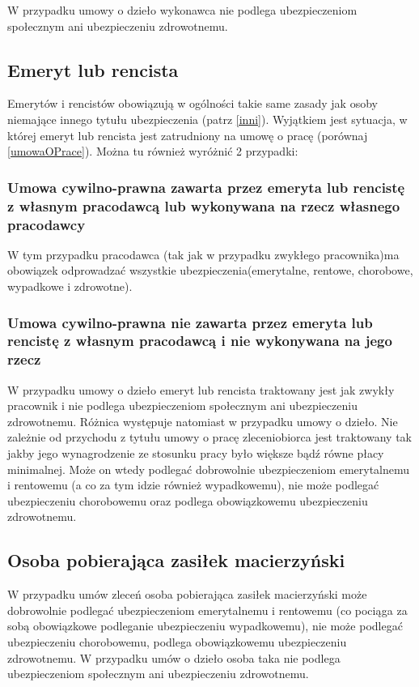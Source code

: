 W przypadku umowy o dzieło wykonawca nie podlega ubezpieczeniom społecznym ani ubezpieczeniu zdrowotnemu.

\subsection[Emeryt lub rencista][Emeryt lub rencista]{Emeryt lub rencista}
Emerytów i rencistów obowiązują w ogólności takie same zasady jak osoby niemające innego tytułu ubezpieczenia (patrz \ref{inni}).
Wyjątkiem jest sytuacja, w której emeryt lub rencista jest zatrudniony na umowę o pracę (porównaj \ref{umowaOPrace}). Można tu również wyróżnić 2 przypadki:

\subsubsection{Umowa cywilno-prawna zawarta przez emeryta lub rencistę z własnym pracodawcą lub wykonywana na rzecz własnego pracodawcy}
W tym przypadku pracodawca (tak jak w przypadku zwykłego pracownika)ma obowiązek odprowadzać wszystkie ubezpieczenia(emerytalne, rentowe, chorobowe, wypadkowe i zdrowotne).

\subsubsection{Umowa cywilno-prawna nie zawarta przez emeryta lub rencistę z własnym pracodawcą i nie wykonywana na jego rzecz}
W przypadku umowy o dzieło emeryt lub rencista traktowany jest jak zwykły pracownik i nie podlega ubezpieczeniom społecznym ani ubezpieczeniu zdrowotnemu. Różnica występuje natomiast w przypadku umowy o dzieło. Nie zależnie od przychodu z tytułu umowy o pracę zleceniobiorca jest traktowany tak jakby jego wynagrodzenie ze stosunku pracy było większe bądź równe płacy minimalnej. Może on wtedy podlegać dobrowolnie ubezpieczeniom emerytalnemu i rentowemu (a co za tym idzie również wypadkowemu), nie może podlegać ubezpieczeniu chorobowemu oraz podlega obowiązkowemu ubezpieczeniu zdrowotnemu.

\subsection[Osoba pobierająca zasiłek macierzyński][Osoba pobierająca zasiłek macierzyński]{Osoba pobierająca zasiłek macierzyński}
W przypadku umów zleceń osoba pobierająca zasiłek macierzyński może dobrowolnie podlegać ubezpieczeniom emerytalnemu i rentowemu (co pociąga za sobą obowiązkowe podleganie ubezpieczeniu wypadkowemu), nie może podlegać ubezpieczeniu chorobowemu, podlega obowiązkowemu ubezpieczeniu zdrowotnemu. W przypadku umów o dzieło osoba taka nie podlega ubezpieczeniom społecznym ani ubezpieczeniu zdrowotnemu.


